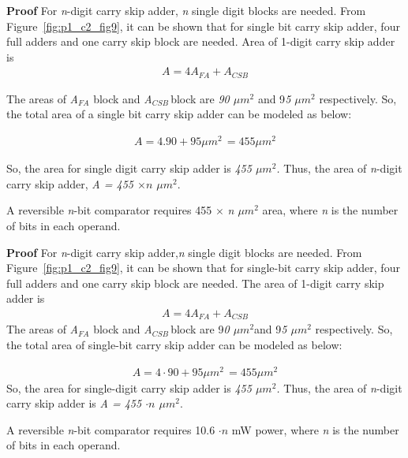 \noindent \textbf{Proof} For {\it n}-digit carry skip adder, {\it n} single digit blocks are needed. From Figure~\ref{fig:p1_c2_fig9}, it can be shown that for single bit carry skip adder, four full adders and one carry skip block are needed. Area of {1}-digit carry skip adder is
	\begin{align*}
	A = 4A{}_{FA} + A{}_{CSB}
	\end{align*}
	 
	
The areas of {\it A${}_{FA}$} block and {\it A${}_{CSB\ }$}block are {\it 90 $\mu m{}^{2}$} and 9{\it 5 $\mu m{}^{2}$} respectively. So, the total area of a single bit carry skip adder can be modeled as below:
	
\begin{align*}
	A = 4 . 90 + 95 \mu m{}^{2\ }=455 \mu m{}^{2}
\end{align*}

So, the area for single digit carry skip adder is {\it 455 $\mu m{}^{2}$. }Thus, the area of {\it n}-digit carry skip adder, {\it A = 455 $\times n$  $\mu m{}^{2}$}.


\begin{property}\textnormal{
A reversible {\it n}-bit comparator requires 455 ${\times}$ {\it n $\mu m{}^{2}$} area, where {\it n} is the number of bits in each operand.}
\end{property}

\noindent \textbf{Proof}
	For {\it n}-digit carry skip adder,{\it n} single digit blocks are needed. From Figure~\ref{fig:p1_c2_fig9}, it can be shown that for single-bit carry skip adder, four full adders and one carry skip block are needed. The area of {1}-digit carry skip adder is
\begin{align*}
A = 4A{}_{FA} + A{}_{CSB}
\end{align*}
\textnormal{The areas of {\it A${}_{FA}$} block and {\it A${}_{CSB\ }$}block are 9{\it 0 $\mu m{}^{2}$}and 9{\it 5 $\mu m{}^{2}$} respectively. So, the total area of single-bit carry skip adder can be modeled as below:}

\begin{align*}
A = 4 \cdot 90 + 95 \mu m{}^{2\ }=455 \mu m{}^{2}
\end{align*}\textnormal{
So, the area for single-digit carry skip adder is {\it 455 $\mu m{}^{2}$. }Thus, the area of {\it n}-digit carry skip adder is {\it A = 455 $\cdot n$  $\mu m{}^{2}$}}.



\begin{property}\textnormal{
	A reversible {\it n}-bit comparator requires {10.6 $\cdot n$  mW }power, where {\it n} is the number of bits in each operand.}
\end{property}

